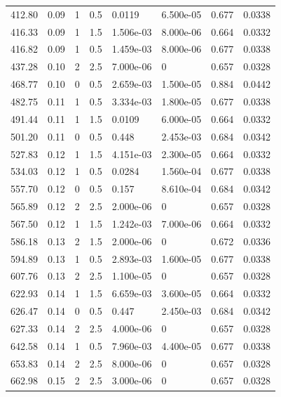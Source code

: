 \documentclass[preview]{standalone}
\begin{document}
{{\begin{tabular}{L{1.2cm}C{1.2cm} C{0.3cm}C{0.5cm} C{1.4cm}C{1.4cm} C{1.4cm}C{1.4cm}}
  412.80  &  0.09  & 1     & 0.5 &  0.0119  & 6.500e-05  & 0.677 &  0.0338   \\ 
  416.33  &  0.09  & 1     & 1.5 &  1.506e-03  & 8.000e-06  & 0.664 &  0.0332   \\ 
  416.82  &  0.09  & 1     & 0.5 &  1.459e-03  & 8.000e-06  & 0.677 &  0.0338   \\ 
  437.28  &  0.10  & 2     & 2.5 &  7.000e-06  & 0  & 0.657 &  0.0328   \\ 
  468.77  &  0.10  & 0     & 0.5 &  2.659e-03  & 1.500e-05  & 0.884 &  0.0442   \\ 
  482.75  &  0.11  & 1     & 0.5 &  3.334e-03  & 1.800e-05  & 0.677 &  0.0338   \\ 
  491.44  &  0.11  & 1     & 1.5 &  0.0109  & 6.000e-05  & 0.664 &  0.0332   \\ 
  501.20  &  0.11  & 0     & 0.5 &  0.448  & 2.453e-03  & 0.684 &  0.0342   \\ 
  527.83  &  0.12  & 1     & 1.5 &  4.151e-03  & 2.300e-05  & 0.664 &  0.0332   \\ 
  534.03  &  0.12  & 1     & 0.5 &  0.0284  & 1.560e-04  & 0.677 &  0.0338   \\ 
  557.70  &  0.12  & 0     & 0.5 &  0.157  & 8.610e-04  & 0.684 &  0.0342   \\ 
  565.89  &  0.12  & 2     & 2.5 &  2.000e-06  & 0  & 0.657 &  0.0328   \\ 
  567.50  &  0.12  & 1     & 1.5 &  1.242e-03  & 7.000e-06  & 0.664 &  0.0332   \\ 
  586.18  &  0.13  & 2     & 1.5 &  2.000e-06  & 0  & 0.672 &  0.0336   \\ 
  594.89  &  0.13  & 1     & 0.5 &  2.893e-03  & 1.600e-05  & 0.677 &  0.0338   \\ 
  607.76  &  0.13  & 2     & 2.5 &  1.100e-05  & 0  & 0.657 &  0.0328   \\ 
  622.93  &  0.14  & 1     & 1.5 &  6.659e-03  & 3.600e-05  & 0.664 &  0.0332   \\ 
  626.47  &  0.14  & 0     & 0.5 &  0.447  & 2.450e-03  & 0.684 &  0.0342   \\ 
  627.33  &  0.14  & 2     & 2.5 &  4.000e-06  & 0  & 0.657 &  0.0328   \\ 
  642.58  &  0.14  & 1     & 0.5 &  7.960e-03  & 4.400e-05  & 0.677 &  0.0338   \\ 
  653.83  &  0.14  & 2     & 2.5 &  8.000e-06  & 0  & 0.657 &  0.0328   \\ 
  662.98  &  0.15  & 2     & 2.5 &  3.000e-06  & 0  & 0.657 &  0.0328   \\ 

\end{tabular}}}
\end{document}
